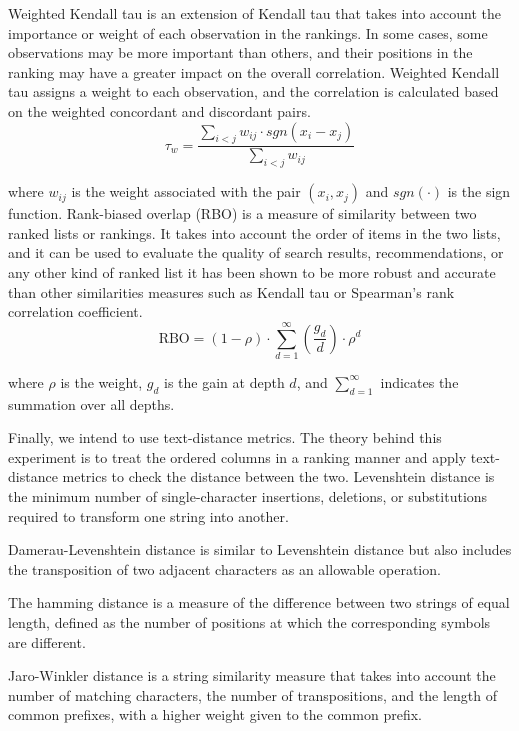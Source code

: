 Weighted Kendall tau  \cite{vignaWeightedCorrelationIndex2015} is an extension of Kendall tau that takes into account the importance or weight of each observation in the rankings. In some cases, some observations may be more important than others, and their positions in the ranking may have a greater impact on the overall correlation. Weighted Kendall tau assigns a weight to each observation, and the correlation is calculated based on the weighted concordant and discordant pairs.
\begin{equation}
\tau_w = \frac{{\sum_{i<j} w_{ij} \cdot sgn(x_i - x_j)}}{{\sum_{i<j} w_{ij}}}
\end{equation}

where $w_{ij}$ is the weight associated with the pair $(x_i, x_j)$ and $sgn(\cdot)$ is the sign function.
Rank-biased overlap (RBO) \cite{webberSimilarityMeasureIndefinite2010} is a measure of similarity between two ranked lists or rankings. It takes into account the order of items in the two lists, and it can be used to evaluate the quality of search results, recommendations, or any other kind of ranked list it has been shown to be more robust and accurate than other similarities measures such as Kendall tau or Spearman's rank correlation coefficient. 
\begin{equation}
\text{{RBO}} = (1 - \rho) \cdot \sum_{d=1}^{\infty} \left( \frac{{g_d}}{{d}} \right) \cdot \rho^d
\end{equation}

where $\rho$ is the weight, $g_d$ is the gain at depth $d$, and $\sum_{d=1}^{\infty}$ indicates the summation over all depths.


Finally, we intend to use text-distance metrics. The theory behind this experiment is to treat the ordered columns in a ranking manner and apply text-distance metrics to check the distance between the two. Levenshtein distance \cite{navarroGuidedTourApproximate2001} is the minimum number of single-character insertions, deletions, or substitutions required to transform one string into another.

Damerau-Levenshtein distance \cite{navarroGuidedTourApproximate2001} is similar to Levenshtein distance but also includes the transposition of two adjacent characters as an allowable operation.

The hamming distance \cite{6772729} is a measure of the difference between two strings of equal length, defined as the number of positions at which the corresponding symbols are different.

Jaro-Winkler distance \cite{navarroGuidedTourApproximate2001} is a string similarity measure that takes into account the number of matching characters, the number of transpositions, and the length of common prefixes, with a higher weight given to the common prefix.




